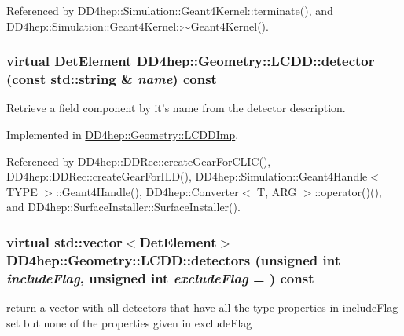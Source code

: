 Referenced by DD4hep::Simulation::Geant4Kernel::terminate(), and DD4hep::Simulation::Geant4Kernel::$\sim$Geant4Kernel().\hypertarget{class_d_d4hep_1_1_geometry_1_1_l_c_d_d_a0ed0c4e5d72a1e07ce11cf2592d6de3e}{
\subsubsection[{detector}]{\setlength{\rightskip}{0pt plus 5cm}virtual {\bf DetElement} DD4hep::Geometry::LCDD::detector (const std::string \& {\em name}) const}}
\label{class_d_d4hep_1_1_geometry_1_1_l_c_d_d_a0ed0c4e5d72a1e07ce11cf2592d6de3e}


Retrieve a field component by it's name from the detector description. 

Implemented in \hyperlink{class_d_d4hep_1_1_geometry_1_1_l_c_d_d_imp_a43a6f0c97177fee5dda8b9a93cee6bad}{DD4hep::Geometry::LCDDImp}.

Referenced by DD4hep::DDRec::createGearForCLIC(), DD4hep::DDRec::createGearForILD(), DD4hep::Simulation::Geant4Handle$<$ TYPE $>$::Geant4Handle(), DD4hep::Converter$<$ T, ARG $>$::operator()(), and DD4hep::SurfaceInstaller::SurfaceInstaller().\hypertarget{class_d_d4hep_1_1_geometry_1_1_l_c_d_d_a1cdc7a631ac397f64b40e7232ee04639}{
\subsubsection[{detectors}]{\setlength{\rightskip}{0pt plus 5cm}virtual std::vector$<${\bf DetElement}$>$ DD4hep::Geometry::LCDD::detectors (unsigned int {\em includeFlag}, \/  unsigned int {\em excludeFlag} = {}) const}}
\label{class_d_d4hep_1_1_geometry_1_1_l_c_d_d_a1cdc7a631ac397f64b40e7232ee04639}
return a vector with all detectors that have all the type properties in includeFlag set but none of the properties given in excludeFlag 

